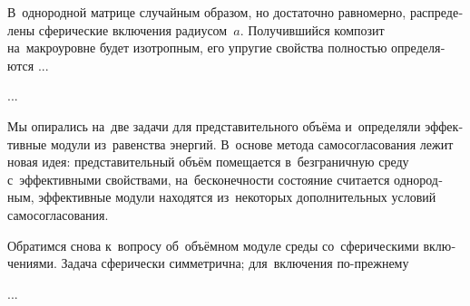 

\begin{otherlanguage}{russian}

В~однородной матрице случайным образом, но достаточно равномерно, распределены сферические включения радиусом~$a$. Получившийся композит на~макроуровне будет изотропным, его упругие свойства полностью определяются ...

...



\end{otherlanguage}



\begin{otherlanguage}{russian}

Мы опирались на~две задачи для представительного объёма и~определяли эффективные модули из~равенства энергий. В~\hbox{основе} метода самосогласования лежит новая идея: представительный объём помещается в~безграничную среду с~эффективными свойствами, на~бесконечности состояние считается однородным, эффективные модули находятся из~некоторых дополнительных условий самосогласования.

Обратимся снова к~вопросу об~объёмном модуле среды со~сферическими включениями. Задача сферически симметрична; для~включения по\hbox{-}прежнему

...



\end{otherlanguage}


